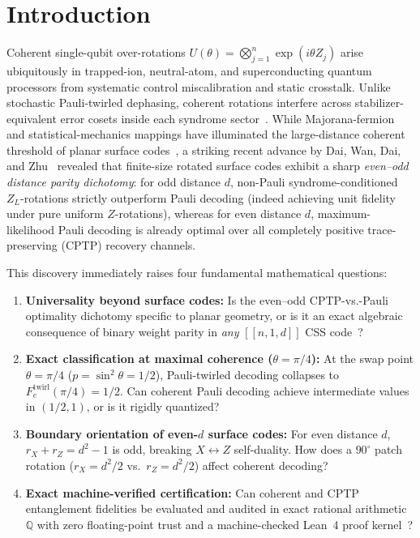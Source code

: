 \documentclass[11pt,a4paper]{article}
\theoremstyle{plain}
\theoremstyle{definition}
\newcommand{\Q}{\mathbb{Q}}
\begin{document}
\section{Introduction}

Coherent single-qubit over-rotations $U(\theta) = \bigotimes_{j=1}^{n} \exp(i\theta Z_j)$ arise ubiquitously in trapped-ion, neutral-atom, and superconducting quantum processors from systematic control miscalibration and static crosstalk. Unlike stochastic Pauli-twirled dephasing, coherent rotations interfere across stabilizer-equivalent error cosets inside each syndrome sector~\cite{Bravyi2018Correcting,Greenbaum2018Modeling,Beale2018Quantum,Huang2019Performance,Iverson2020Coherence}. While Majorana-fermion and statistical-mechanics mappings have illuminated the large-distance coherent threshold of planar surface codes~\cite{Venn2020Error,Venn2023Coherent,Behrends2024Surface}, a striking recent advance by Dai, Wan, Dai, and Zhu~\cite{Dai2026CoherentSurface} revealed that finite-size rotated surface codes exhibit a sharp \emph{even--odd distance parity dichotomy}: for odd distance $d$, non-Pauli syndrome-conditioned $Z_L$-rotations strictly outperform Pauli decoding (indeed achieving unit fidelity under pure uniform $Z$-rotations), whereas for even distance $d$, maximum-likelihood Pauli decoding is already optimal over all completely positive trace-preserving (CPTP) recovery channels.

This discovery immediately raises four fundamental mathematical questions:
\begin{enumerate}[leftmargin=1.5em,itemsep=2pt]
  \item \textbf{Universality beyond surface codes:} Is the even--odd CPTP-vs.-Pauli optimality dichotomy specific to planar geometry, or is it an exact algebraic consequence of binary weight parity in \emph{any} $[[n,1,d]]$ CSS code~\cite{Calderbank1996Good,Steane1996Multiple}?
  \item \textbf{Exact classification at maximal coherence ($\theta = \pi/4$):} At the swap point $\theta = \pi/4$ ($p = \sin^2\theta = 1/2$), Pauli-twirled decoding collapses to $F_e^{\mathrm{twirl}}(\pi/4) = 1/2$. Can coherent Pauli decoding achieve intermediate values in $(1/2, 1)$, or is it rigidly quantized?
  \item \textbf{Boundary orientation of even-$d$ surface codes:} For even distance $d$, $r_X + r_Z = d^2 - 1$ is odd, breaking $X \leftrightarrow Z$ self-duality. How does a $90^\circ$ patch rotation ($r_X = d^2/2$ vs.\ $r_Z = d^2/2$) affect coherent decoding?
  \item \textbf{Exact machine-verified certification:} Can coherent and CPTP entanglement fidelities be evaluated and audited in exact rational arithmetic $\Q$ with zero floating-point trust and a machine-checked Lean~4 proof kernel~\cite{deMoura2021Lean4}?
\end{enumerate}
\end{document}
